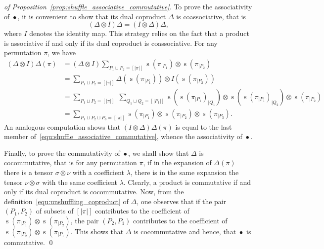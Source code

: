 \documentclass[a4paper]{llncs}
\DeclareMathOperator{\STD}{\mathrm{s}}
\DeclareMathOperator{\SHUFFLE}{\bullet}
\begin{document}
\begin{proof}[of Proposition~\ref{prop:shuffle_associative_commutative}]
    To prove the associativity of $\SHUFFLE$, it is convenient to show
    that its dual coproduct $\Delta$ is coassociative, that is
    \begin{equation}
        (\Delta \otimes I) \Delta = (I \otimes \Delta) \Delta,
    \end{equation}
    where $I$ denotes the identity map. This strategy relies on the fact
    that a product is associative if and only if its dual coproduct is
    coassociative. For any permutation $\pi$, we have
    \begin{equation} \begin{split}
    \label{equ:shuffle_associative_commutative}
        (\Delta \otimes I) \Delta(\pi) & =
        (\Delta \otimes I)
        \sum_{P_1 \sqcup P_2 = [|\pi|]}
        \STD\left(\pi_{|P_1}\right) \otimes \STD\left(\pi_{|P_2}\right) \\
        & =
        \sum_{P_1 \sqcup P_2 = [|\pi|]}
        \Delta\left(\STD\left(\pi_{|P_1}\right)\right)
        \otimes I\left(\STD\left(\pi_{|P_2}\right)\right) \\
        & =
        \sum_{P_1 \sqcup P_2 = [|\pi|]} \;
        \sum_{Q_1 \sqcup Q_2 = [|P_1|]}
        \STD\left(\STD\left(\pi_{|P_1}\right)_{|Q_1}\right)
        \otimes
        \STD\left(\STD\left(\pi_{|P_1}\right)_{|Q_2}\right)
        \otimes \STD\left(\pi_{|P_2}\right) \\
        & =
        \sum_{P_1 \sqcup P_2 \sqcup P_3 = [|\pi|]}
        \STD\left(\pi_{|P_1}\right) \otimes
        \STD\left(\pi_{|P_2}\right) \otimes
        \STD\left(\pi_{|P_3}\right).
    \end{split} \end{equation}
    An analogous computation shows that $(I \otimes \Delta) \Delta(\pi)$
    is equal to the last member
    of~\eqref{equ:shuffle_associative_commutative}, whence the
    associativity of $\SHUFFLE$.
    \smallskip

    Finally, to prove the commutativity of $\SHUFFLE$, we shall show
    that $\Delta$ is cocommutative, that is for any permutation $\pi$,
    if in the expansion of $\Delta(\pi)$ there is a tensor
    $\sigma \otimes \nu$ with a coefficient $\lambda$, there is in the
    same expansion the tensor $\nu \otimes \sigma$ with the same
    coefficient $\lambda$. Clearly, a product is commutative if and only
    if its dual coproduct is cocommutative. Now, from the
    definition~\eqref{equ:unshuffling_coproduct} of $\Delta$, one
    observes that if the pair $(P_1, P_2)$ of subsets of $[|\pi|]$
    contributes to the coefficient of
    $\STD\left(\pi_{|P_1}\right) \otimes \STD\left(\pi_{|P_2}\right)$,
    the pair $(P_2, P_1)$ contributes to the coefficient of
    $\STD\left(\pi_{|P_2}\right) \otimes \STD\left(\pi_{|P_1}\right)$.
    This shows that $\Delta$ is cocommutative and hence, that $\SHUFFLE$
    is commutative.
    \qed
\end{proof}
\end{document}
